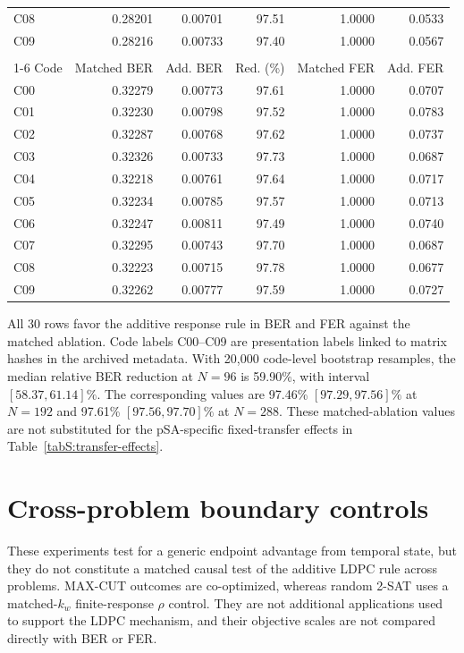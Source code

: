 \documentclass[aps,prapplied,preprint,superscriptaddress,longbibliography,floatfix]{revtex4-2}
\begin{document}
\begin{longtable}{lrrrrr}
C08 & 0.28201 & 0.00701 & 97.51 & 1.0000 & 0.0533 \\
C09 & 0.28216 & 0.00733 & 97.40 & 1.0000 & 0.0567 \\
\pagebreak[4]
\midrule
\multicolumn{6}{c}{\textbf{(c)} $N=288$} \\
\cmidrule(lr){1-6}
Code & Matched BER & Add. BER & Red. (\%) & Matched FER & Add. FER \\
\midrule
C00 & 0.32279 & 0.00773 & 97.61 & 1.0000 & 0.0707 \\
C01 & 0.32230 & 0.00798 & 97.52 & 1.0000 & 0.0783 \\
C02 & 0.32287 & 0.00768 & 97.62 & 1.0000 & 0.0737 \\
C03 & 0.32326 & 0.00733 & 97.73 & 1.0000 & 0.0687 \\
C04 & 0.32218 & 0.00761 & 97.64 & 1.0000 & 0.0717 \\
C05 & 0.32234 & 0.00785 & 97.57 & 1.0000 & 0.0713 \\
C06 & 0.32247 & 0.00811 & 97.49 & 1.0000 & 0.0740 \\
C07 & 0.32295 & 0.00743 & 97.70 & 1.0000 & 0.0687 \\
C08 & 0.32223 & 0.00715 & 97.78 & 1.0000 & 0.0677 \\
C09 & 0.32262 & 0.00777 & 97.59 & 1.0000 & 0.0727 \\
\bottomrule
\end{longtable}
\endgroup
\clearpage

All 30 rows favor the additive response rule in BER and FER against the matched ablation.  Code labels C00--C09 are presentation labels linked to matrix hashes in the archived metadata.  With 20,000 code-level bootstrap resamples, the median relative BER reduction at $N=96$ is 59.90\%, with interval $[58.37,61.14]\%$.  The corresponding values are 97.46\% $[97.29,97.56]\%$ at $N=192$ and 97.61\% $[97.56,97.70]\%$ at $N=288$.  These matched-ablation values are not substituted for the pSA-specific fixed-transfer effects in Table~\ref{tabS:transfer-effects}.

\section{Cross-problem boundary controls}

These experiments test for a generic endpoint advantage from temporal state, but they do not constitute a matched causal test of the additive LDPC rule across problems.  MAX-CUT outcomes are co-optimized, whereas random 2-SAT uses a matched-$k_w$ finite-response $\rho$ control.  They are not additional applications used to support the LDPC mechanism, and their objective scales are not compared directly with BER or FER.
\end{document}
